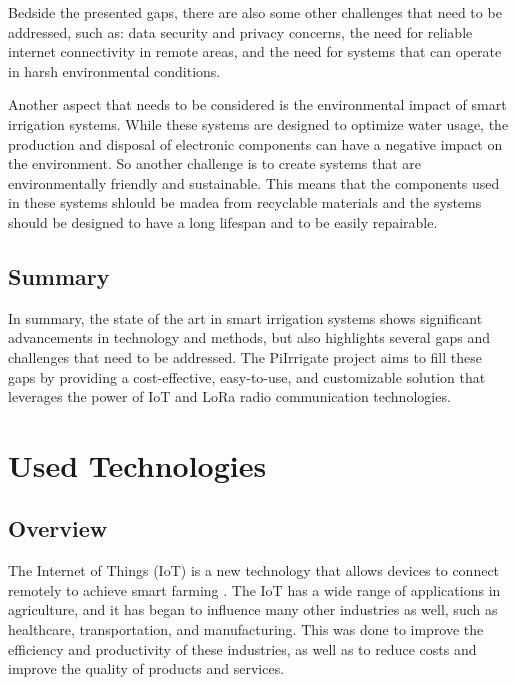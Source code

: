 Bedside the presented gaps, there are also some other challenges that need to be addressed, such as:
data security and privacy concerns, the need for reliable internet connectivity in remote areas, 
and the need for systems that can operate in harsh environmental conditions. 

Another aspect that needs to be considered is the environmental impact of smart irrigation systems.
While these systems are designed to optimize water usage,
the production and disposal of electronic components can have a negative impact on the environment.
So another challenge is to create systems that are environmentally friendly and sustainable. This means 
that the components used in these systems shlould be madea from recyclable materials 
and the systems should be designed to have a long lifespan and to be easily repairable.

\section{Summary}
In summary, the state of the art in smart irrigation systems shows significant 
advancements in technology and methods, but also highlights several gaps and challenges 
that need to be addressed. The PiIrrigate project aims to fill these gaps by providing a
cost-effective, easy-to-use, and customizable solution that leverages the power of IoT and LoRa 
radio communication technologies. 

\chapter{Used Technologies}
\section{Overview}
The Internet of Things (IoT) is a new technology that allows devices to connect remotely to achieve smart
farming \cite{agriculture12101745}. The IoT has a wide range of applications in agriculture, and it has 
began to influence many other industries as well, such as healthcare, transportation, and manufacturing. 
This was done to improve the efficiency and productivity of these industries, 
as well as to reduce costs and improve the quality of products and services\cite{s19081833}.

